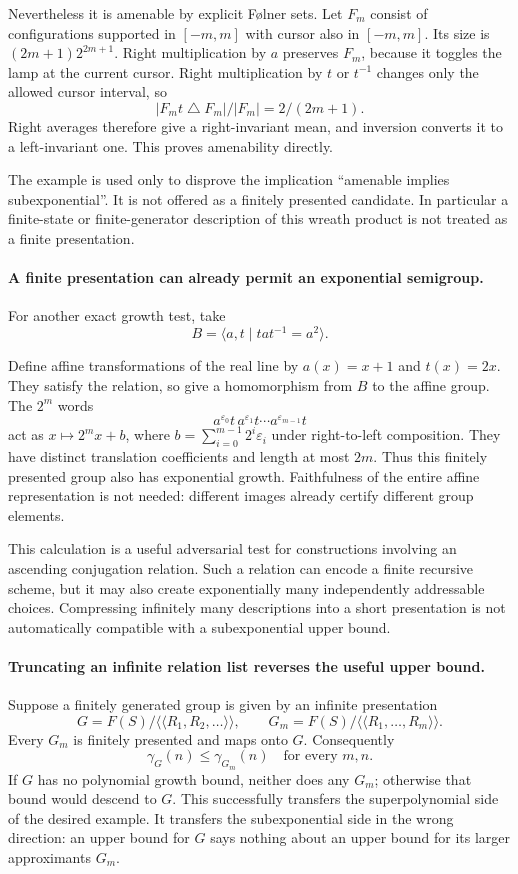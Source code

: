 \documentclass[11pt]{article}
\begin{document}
Nevertheless it is amenable by explicit Følner sets. Let $F_m$ consist
of configurations supported in $[-m,m]$ with cursor also in $[-m,m]$.
Its size is $(2m+1)2^{2m+1}$. Right multiplication by $a$ preserves
$F_m$, because it toggles the lamp at the current cursor. Right
multiplication by $t$ or $t^{-1}$ changes only the allowed cursor
interval, so
\[
 |F_m t\mathbin\triangle F_m|/|F_m|=2/(2m+1).
\]
Right averages therefore give a right-invariant mean, and inversion
converts it to a left-invariant one. This proves amenability directly.

The example is used only to disprove the implication ``amenable implies
subexponential''. It is not offered as a finitely presented candidate.
In particular a finite-state or finite-generator description of this
wreath product is not treated as a finite presentation.

\paragraph{A finite presentation can already permit an exponential semigroup.}
For another exact growth test, take
\[
 B=\langle a,t\mid tat^{-1}=a^2\rangle.
\]

Define affine transformations of the real line by $a(x)=x+1$ and
$t(x)=2x$. They satisfy the relation, so give a homomorphism from $B$
to the affine group. The $2^m$ words
\[
 a^{\varepsilon_0}t\,a^{\varepsilon_1}t\cdots
                         a^{\varepsilon_{m-1}}t
\]
act as $x\mapsto2^m x+b$, where
$b=\sum_{i=0}^{m-1}2^i\varepsilon_i$ under right-to-left composition.
They have distinct translation coefficients and length at most $2m$.
Thus this finitely presented group also has exponential growth. Faithfulness
of the entire affine representation is not needed: different images
already certify different group elements.

This calculation is a useful adversarial test for constructions involving
an ascending conjugation relation. Such a relation can encode a finite
recursive scheme, but it may also create exponentially many independently
addressable choices. Compressing infinitely many descriptions into a
short presentation is not automatically compatible with a subexponential
upper bound.

\paragraph{Truncating an infinite relation list reverses the useful upper bound.}
Suppose a finitely generated group is given by an infinite presentation
\[
 G=F(S)/\langle\!\langle R_1,R_2,\ldots\rangle\!\rangle,
 \qquad G_m=F(S)/\langle\!\langle R_1,\ldots,R_m\rangle\!\rangle.
\]
Every $G_m$ is finitely presented and maps onto $G$. Consequently
\[
 \gamma_G(n)\le\gamma_{G_m}(n)
 \quad\text{for every }m,n.
 \tag{374.6}
\]
If $G$ has no polynomial growth bound, neither does any $G_m$; otherwise
that bound would descend to $G$. This successfully transfers the
superpolynomial side of the desired example. It transfers the
subexponential side in the wrong direction: an upper bound for $G$
says nothing about an upper bound for its larger approximants $G_m$.
\end{document}
